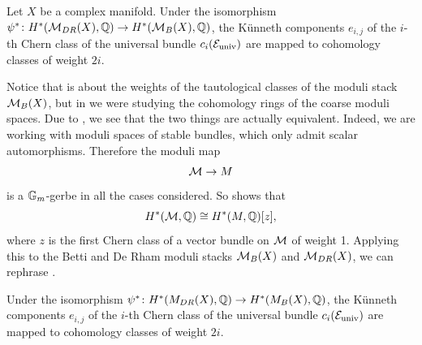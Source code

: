 \begin{thm} \cite[]{Shende-weights} \label{thm: shende's weights}
Let $X$ be a complex manifold. Under the isomorphism $\psi^* \colon  H^*(\mathcal{M}_{DR}(X), \mathbb{Q}) \to H^*(\mathcal{M}_{B}(X), \mathbb{Q})$, the K\"unneth components $e_{i,j}$ of the $i$-th Chern class of the universal bundle $c_i(\mathcal{E}_{\text{univ}})$ are mapped to cohomology classes of weight $2i$.
\end{thm}

Notice that  is about the weights of the tautological classes of the moduli stack $\mathcal{M}_B(X)$, but in  we were studying the cohomology rings of the coarse moduli spaces. Due to \cite{Heinloth-Gm-gerbes}, we see that the two things are actually equivalent. Indeed, we are working with moduli spaces of stable bundles, which only admit scalar automorphisms. Therefore the moduli map
\begin{equation}
\mathcal{M} \to M
\end{equation}
is a $\mathbb{G}_m$-gerbe in all the cases considered. So \cite[Lemma 3.1]{Heinloth-Gm-gerbes} shows that
\begin{equation}
H^*(\mathcal{M}, \mathbb{Q}) \cong H^*(M, \mathbb{Q})[z],
\end{equation}
where $z$ is the first Chern class of a vector bundle on $\mathcal{M}$ of weight 1. Applying this to the Betti and De Rham moduli stacks $\mathcal{M}_B(X)$ and $\mathcal{M}_{DR}(X)$, we can rephrase .
\begin{thm}
Under the isomorphism $\psi^* \colon  H^*(M_{DR}(X), \mathbb{Q}) \to H^*(M_{B}(X), \mathbb{Q})$, the K\"unneth components $e_{i,j}$ of the $i$-th Chern class of the universal bundle $c_i(\mathcal{E}_{\text{univ}})$ are mapped to cohomology classes of weight $2i$.
\end{thm}

